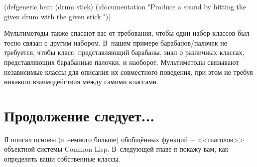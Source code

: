 \begin{myverb}
(defgeneric beat (drum stick)
  (:documentation
   "Produce a sound by hitting the given drum with the given stick."))
\end{myverb}


Мультиметоды также спасают вас от требования, чтобы один набор классов был тесно связан с
другим набором. В~нашем примере барабанов/палочек не требуется, чтобы класс,
представляющий барабаны, знал о различных классах, представляющих барабанные палочки, и
наоборот.  Мультиметоды связывают независимые классы для описания их совместного
поведения, при этом не требуя никакого взаимодействия между самими классами.

\section{Продолжение следует...}

Я описал основы (и немного больше) обобщённых функций~-- <<глаголов>> объектной системы
Common Lisp.  В~следующей главе я покажу вам, как определять ваши собственные классы.


